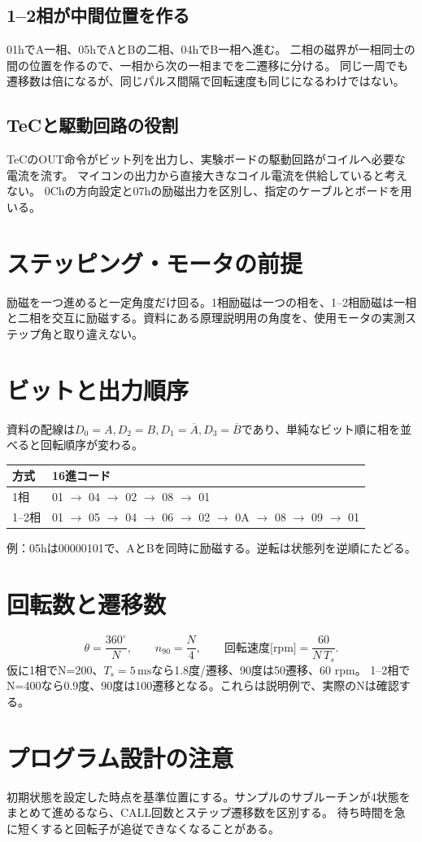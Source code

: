 \documentclass[lualatex,a4paper,10pt]{jlreq}
\begin{document}
\subsection{1--2相が中間位置を作る}
01hでA一相、05hでAとBの二相、04hでB一相へ進む。
二相の磁界が一相同士の間の位置を作るので、一相から次の一相までを二遷移に分ける。
同じ一周でも遷移数は倍になるが、同じパルス間隔で回転速度も同じになるわけではない。
\subsection{TeCと駆動回路の役割}
TeCのOUT命令がビット列を出力し、実験ボードの駆動回路がコイルへ必要な電流を流す。
マイコンの出力から直接大きなコイル電流を供給していると考えない。
0Chの方向設定と07hの励磁出力を区別し、指定のケーブルとボードを用いる。

\section{ステッピング・モータの前提}\label{sec:auto3}
励磁を一つ進めると一定角度だけ回る。1相励磁は一つの相を、1--2相励磁は一相と二相を交互に励磁する。資料にある原理説明用の角度を、使用モータの実測ステップ角と取り違えない。
\section{ビットと出力順序}\label{sec:auto4}
資料の配線は$D_0=A,D_2=B,D_1=\overline A,D_3=\overline B$であり、単純なビット順に相を並べると回転順序が変わる。
\par\noindent\begin{tabularx}{\linewidth}{lY}
\toprule 方式 & 16進コード\\\midrule
1相 & 01 $\to$ 04 $\to$ 02 $\to$ 08 $\to$ 01\\
1--2相 & 01 $\to$ 05 $\to$ 04 $\to$ 06 $\to$ 02 $\to$ 0A $\to$ 08 $\to$ 09 $\to$ 01\\\bottomrule
\end{tabularx}
例：05hは00000101で、AとBを同時に励磁する。逆転は状態列を逆順にたどる。
\section{回転数と遷移数}\label{sec:auto5}
\[
 \theta=\frac{360^\circ}{N},\qquad n_{90}=\frac N4,\qquad
 \text{回転速度[rpm]}=\frac{60}{N\,T_s}.
\]
仮に1相でN=200、$T_s=5\,\mathrm{ms}$なら1.8度/遷移、90度は50遷移、60 rpm。
1--2相でN=400なら0.9度、90度は100遷移となる。これらは説明例で、実際のNは確認する。
\clearpage
\section{プログラム設計の注意}\label{sec:auto6}
初期状態を設定した時点を基準位置にする。サンプルのサブルーチンが4状態をまとめて進めるなら、CALL回数とステップ遷移数を区別する。
待ち時間を急に短くすると回転子が追従できなくなることがある。
\end{document}
